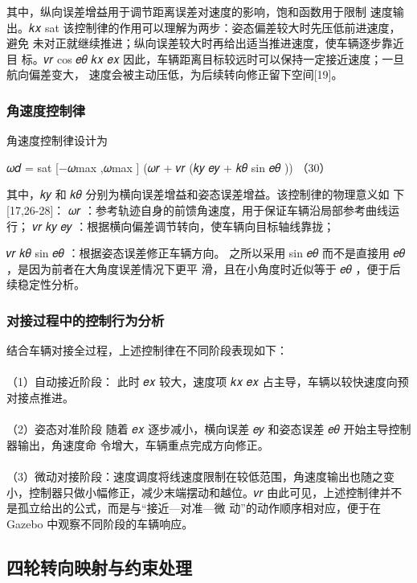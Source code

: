 其中，纵向误差增益用于调节距离误差对速度的影响，饱和函数用于限制
速度输出。𝑘𝑥 sat
该控制律的作用可以理解为两步：姿态偏差较大时先压低前进速度，避免
未对正就继续推进；纵向误差较大时再给出适当推进速度，使车辆逐步靠近目
标。𝑣𝑟 cos 𝑒𝜃 𝑘𝑥 𝑒𝑥
因此，车辆距离目标较远时可以保持一定接近速度；一旦航向偏差变大，
速度会被主动压低，为后续转向修正留下空间[19]。
\subsubsection{角速度控制律}
角速度控制律设计为

𝜔𝑑 = sat [−𝜔max ,𝜔max ] (𝜔𝑟 + 𝑣𝑟 (𝑘𝑦 𝑒𝑦 + 𝑘𝜃 sin 𝑒𝜃 ))   （30）

其中，𝑘𝑦 和 𝑘𝜃 分别为横向误差增益和姿态误差增益。该控制律的物理意义如
下[17,26-28]：
𝜔𝑟 ：参考轨迹自身的前馈角速度，用于保证车辆沿局部参考曲线运行；
𝑣𝑟 𝑘𝑦 𝑒𝑦 ：根据横向偏差调节转向，使车辆向目标轴线靠拢；







𝑣𝑟 𝑘𝜃 sin 𝑒𝜃 ：根据姿态误差修正车辆方向。
之所以采用 sin 𝑒𝜃 而不是直接用 𝑒𝜃 ，是因为前者在大角度误差情况下更平
滑，且在小角度时近似等于 𝑒𝜃 ，便于后续稳定性分析。
\subsubsection{对接过程中的控制行为分析}
结合车辆对接全过程，上述控制律在不同阶段表现如下：
\paragraph{} （1）自动接近阶段：
此时 𝑒𝑥 较大，速度项 𝑘𝑥 𝑒𝑥 占主导，车辆以较快速度向预对接点推进。
\paragraph{} （2）姿态对准阶段
随着 𝑒𝑥 逐步减小，横向误差 𝑒𝑦 和姿态误差 𝑒𝜃 开始主导控制器输出，角速度命
令增大，车辆重点完成方向修正。
\paragraph{} （3）微动对接阶段：速度调度将线速度限制在较低范围，角速度输出也随之变
小，控制器只做小幅修正，减少末端摆动和越位。𝑣𝑟
由此可见，上述控制律并不是孤立给出的公式，而是与“接近—对准—微
动”的动作顺序相对应，便于在 Gazebo 中观察不同阶段的车辆响应。
\subsection{四轮转向映射与约束处理}
